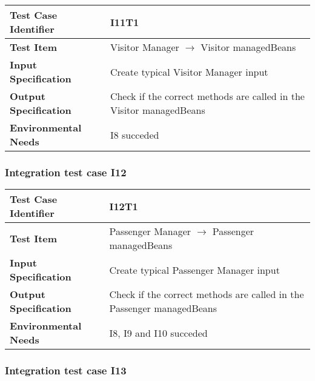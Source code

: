 \begin{table}[!htbp]
\begin{center}
\begin{tabular}[t]{p{}p{}}

\hline
\textbf{Test Case Identifier} & I11T1 \\
\hline
\textbf{Test Item} & Visitor Manager $\rightarrow$ Visitor managedBeans \\
\hline
\textbf{Input Specification} & Create typical Visitor Manager input  \\
\hline
\textbf{Output Specification} & Check if the correct methods are called in the Visitor managedBeans \\
\hline
\textbf{Environmental Needs} & I8 succeded \\
\hline

\end{tabular}
\end{center}
\end{table}
\clearpage


\subsubsection{Integration test case I12}

\begin{table}[!htbp]
\begin{center}
\begin{tabular}[t]{p{}p{}}

\hline
\textbf{Test Case Identifier} & I12T1 \\
\hline
\textbf{Test Item} & Passenger Manager $\rightarrow$ Passenger managedBeans \\
\hline
\textbf{Input Specification} & Create typical Passenger Manager input  \\
\hline
\textbf{Output Specification} & Check if the correct methods are called in the Passenger managedBeans \\
\hline
\textbf{Environmental Needs} & I8, I9 and I10 succeded \\
\hline

\end{tabular}
\end{center}
\end{table}

\subsubsection{Integration test case I13}

